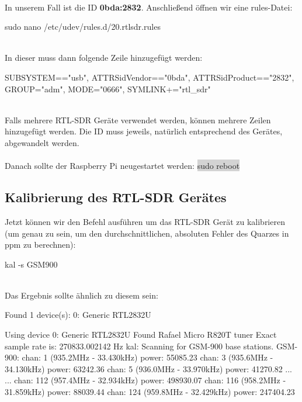 \noindent{}\\In unserem Fall ist die ID \textbf{0bda:2832}. Anschließend öffnen wir eine rules-Datei:

\begin{code}
sudo nano /etc/udev/rules.d/20.rtlsdr.rules
\end{code}

\noindent\\ In dieser muss dann folgende Zeile hinzugefügt werden:

\begin{code}
SUBSYSTEM=="usb", ATTRS{idVendor}=="0bda", ATTRS{idProduct}=="2832", GROUP="adm", MODE="0666", SYMLINK+="rtl_sdr"
\end{code}

\noindent\\Falls mehrere RTL-SDR Geräte verwendet werden, können mehrere Zeilen hinzugefügt werden. Die ID muss jeweils, natürlich entsprechend des Gerätes, abgewandelt werden.\\
\\Danach sollte der Raspberry Pi neugestartet werden: \colorbox{lightgray}{sudo reboot}

\subsection{Kalibrierung des RTL-SDR Gerätes} \label{Kal}
Jetzt können wir den Befehl ausführen um das RTL-SDR Gerät zu kalibrieren (um genau zu sein, um den durchschnittlichen, absoluten Fehler des Quarzes in ppm zu berechnen):

%
%

\begin{code}
kal -s GSM900 
\end{code}

\noindent\\Das Ergebnis sollte ähnlich zu diesem sein:

\begin{code}
Found 1 device(s):
  0:  Generic RTL2832U

Using device 0: Generic RTL2832U
Found Rafael Micro R820T tuner
Exact sample rate is: 270833.002142 Hz
kal: Scanning for GSM-900 base stations.
GSM-900:
	chan: 1 (935.2MHz - 33.430kHz)	power: 55085.23
	chan: 3 (935.6MHz - 34.130kHz)	power: 63242.36
	chan: 5 (936.0MHz - 33.970kHz)	power: 41270.82
...
...
	chan: 112 (957.4MHz - 32.934kHz)	power: 498930.07
	chan: 116 (958.2MHz - 31.859kHz)	power: 88039.44
	chan: 124 (959.8MHz - 32.429kHz)	power: 247404.23
\end{code}

